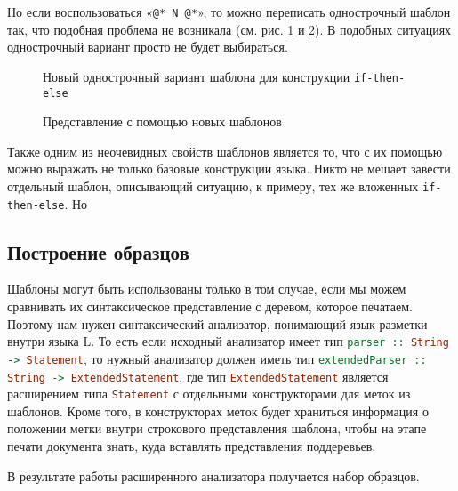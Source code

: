 Но если воспользоваться «\lstinline{@* N @*}», то можно переписать однострочный шаблон так, что подобная проблема не возникала (см. рис. \ref{fig:flatGoodIfTmplt} и \ref{fig:nestedIfCode}). В подобных ситуациях однострочный вариант просто не будет выбираться.

\begin{figure}[h!]
	
	\caption{Новый однострочный вариант шаблона для конструкции \lstinline{if-then-else}}
	\label{fig:flatGoodIfTmplt}	
\end{figure}

\begin{figure}[h!]
	\centering
	
	\caption{Представление с помощью новых шаблонов}
	\label{fig:nestedIfCode}
\end{figure}

Также одним из неочевидных свойств шаблонов является то, что с их помощью можно выражать не только базовые конструкции языка. Никто не мешает завести отдельный шаблон, описывающий ситуацию, к примеру, тех же вложенных \lstinline{if-then-else}. Но 

\subsection{Построение образцов}

Шаблоны могут быть использованы только в том случае, если мы можем сравнивать их синтаксическое представление с деревом, которое печатаем. Поэтому нам нужен синтаксический анализатор, понимающий язык разметки внутри языка L. То есть если исходный анализатор имеет тип \lstinline[language=Haskell]{parser :: String -> Statement}, то нужный анализатор должен иметь тип \lstinline[language=Haskell]{extendedParser :: String -> ExtendedStatement}, где тип \lstinline[language=Haskell]{ExtendedStatement} является расширением типа \lstinline[language=Haskell]{Statement} с отдельными конструкторами для меток из шаблонов. Кроме того, в конструкторах меток будет храниться информация о положении метки внутри строкового представления шаблона, чтобы на этапе печати документа знать, куда вставлять представления поддеревьев.

В результате работы расширенного анализатора получается набор образцов.


% 	

